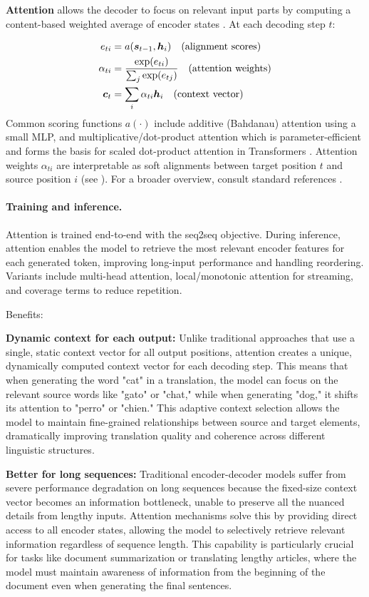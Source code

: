 \textbf{Attention} allows the decoder to focus on relevant input parts by computing a content-based weighted average of encoder states \cite{Bahdanau2014}. At each decoding step $t$:

\begin{align}
e_{ti} &= a(\boldsymbol{s}_{t-1}, \boldsymbol{h}_i) \quad \text{(alignment scores)} \\
\alpha_{ti} &= \frac{\exp(e_{ti})}{\sum_j \exp(e_{tj})} \quad \text{(attention weights)} \\
\boldsymbol{c}_t &= \sum_i \alpha_{ti} \boldsymbol{h}_i \quad \text{(context vector)}
\end{align}
Common scoring functions $a(\cdot)$ include additive (Bahdanau) attention using a small MLP, and multiplicative/dot-product attention which is parameter-efficient and forms the basis for scaled dot-product attention in Transformers \cite{Vaswani2017}. Attention weights $\alpha_{ti}$ are interpretable as soft alignments between target position $t$ and source position $i$ (see \cite{WebAttentionWikipedia}). For a broader overview, consult standard references \cite{WebDLBRNN,D2LChapterAttention}.

\paragraph{Training and inference.} Attention is trained end-to-end with the seq2seq objective. During inference, attention enables the model to retrieve the most relevant encoder features for each generated token, improving long-input performance and handling reordering. Variants include multi-head attention, local/monotonic attention for streaming, and coverage terms to reduce repetition.

Benefits:

\textbf{Dynamic context for each output:} Unlike traditional approaches that use a single, static context vector for all output positions, attention creates a unique, dynamically computed context vector for each decoding step. This means that when generating the word "cat" in a translation, the model can focus on the relevant source words like "gato" or "chat," while when generating "dog," it shifts its attention to "perro" or "chien." This adaptive context selection allows the model to maintain fine-grained relationships between source and target elements, dramatically improving translation quality and coherence across different linguistic structures.

\textbf{Better for long sequences:} Traditional encoder-decoder models suffer from severe performance degradation on long sequences because the fixed-size context vector becomes an information bottleneck, unable to preserve all the nuanced details from lengthy inputs. Attention mechanisms solve this by providing direct access to all encoder states, allowing the model to selectively retrieve relevant information regardless of sequence length. This capability is particularly crucial for tasks like document summarization or translating lengthy articles, where the model must maintain awareness of information from the beginning of the document even when generating the final sentences.

